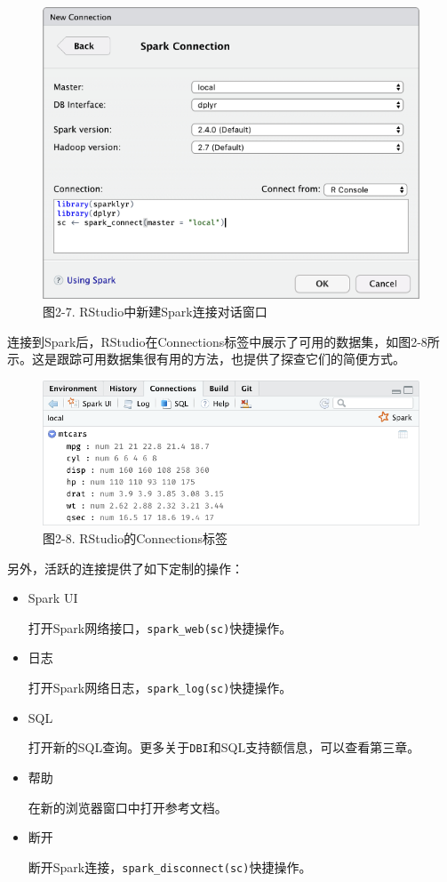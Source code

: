 \documentclass[
]{article}
\begin{document}
\begin{figure}
\centering
\includegraphics{figures/2_7.png}
\caption{图2-7. RStudio中新建Spark连接对话窗口}
\end{figure}

连接到Spark后，RStudio在Connections标签中展示了可用的数据集，如图2-8所示。这是跟踪可用数据集很有用的方法，也提供了探查它们的简便方式。

\begin{figure}
\centering
\includegraphics{figures/2_8.png}
\caption{图2-8. RStudio的Connections标签}
\end{figure}

另外，活跃的连接提供了如下定制的操作：

\begin{itemize}
\item
  Spark UI

  打开Spark网络接口，\texttt{spark\_web(sc)}快捷操作。
\item
  日志

  打开Spark网络日志，\texttt{spark\_log(sc)}快捷操作。
\item
  SQL

  打开新的SQL查询。更多关于\texttt{DBI}和SQL支持额信息，可以查看第三章。
\item
  帮助

  在新的浏览器窗口中打开参考文档。
\item
  断开

  断开Spark连接，\texttt{spark\_disconnect(sc)}快捷操作。
\end{itemize}
\end{document}
